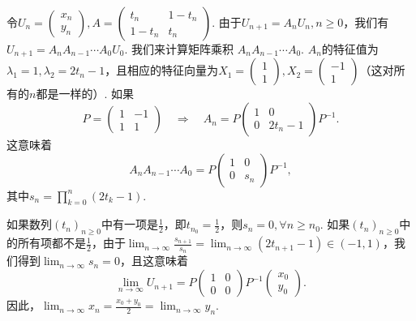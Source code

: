 \begin{solution}
  令$U_n=\begin{pmatrix}
    x_n \\ y_n
  \end{pmatrix},A=\begin{pmatrix}
    t_n & 1 - t_n \\
    1 - t_n & t_n
  \end{pmatrix}$. 由于$U_{n+1}=A_nU_n,n\ge0$，我们有$U_{n+1}=A_nA_{n-1}\cdots A_0U_0$. 我们来计算矩阵乘积
  $A_nA_{n-1}\cdots A_0$. $A_n$的特征值为$\lambda_1=1,\lambda_2=2t_n-1$，且相应的特征向量为$X_1=\begin{pmatrix}
    1 \\ 1
  \end{pmatrix},X_2=\begin{pmatrix}
    -1 \\ 1
  \end{pmatrix}$（这对所有的$n$都是一样的）. 如果
  \[
    P = \begin{pmatrix}
      1 & -1 \\
      1 & 1
    \end{pmatrix}\quad \Rightarrow \quad
    A_n = P \begin{pmatrix}
      1 & 0 \\
      0 & 2t_n - 1
    \end{pmatrix} P^{-1}.
  \]
  这意味着
  \[
    A_nA_{n-1} \cdots A_0 = P \begin{pmatrix}
      1 & 0 \\
      0 & s_n
    \end{pmatrix} P^{-1},
  \]
  其中$s_n=\prod_{k=0}^n(2t_k-1)$.

  如果数列$(t_n)_{n\ge0}$中有一项是$\frac12$，即$t_{n_0}=\frac12$，则$s_n=0,\forall n\ge n_0$. 如果$(t_n)_{n\ge0}$中的所有项都不是$\frac12$，由于$\lim_{n\to\infty}\frac{s_{n+1}}{s_n}=\lim_{n\to\infty}
  (2t_{n+1}-1)\in(-1,1)$，我们得到$\lim_{n\to\infty}s_n=0$，且这意味着
  \[
    \lim_{n\to\infty}U_{n+1} = P\begin{pmatrix}
      1 & 0 \\
      0 & 0
    \end{pmatrix} P^{-1}
    \begin{pmatrix}
      x_0 \\ y_0
    \end{pmatrix}.
  \]
  因此，$\lim_{n\to\infty}x_n=\frac{x_0+y_0}2
  =\lim_{n\to\infty}y_n$.
\end{solution}

